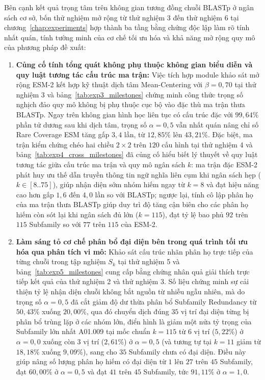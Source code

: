 Bên cạnh kết quả trọng tâm trên không gian tương đồng chuỗi BLASTp ở ngân sách cơ sở, bốn thử nghiệm mở rộng từ thử nghiệm 3 đến thử nghiệm 6 tại chương~\ref{chap:experiments} hợp thành ba tầng bằng chứng độc lập làm rõ tính nhất quán, tính tường minh của cơ chế tối ưu hóa và khả năng mở rộng quy mô của phương pháp đề xuất:

\begin{enumerate}
    \item \textbf{Củng cố tính tổng quát không phụ thuộc không gian biểu diễn và quy luật tương tác cấu trúc ma trận:} Việc tích hợp module khảo sát mở rộng ESM-2 kết hợp kỹ thuật dịch tâm Mean-Centering với $\beta = 0{,}70$ tại thử nghiệm 3 và bảng~\ref{tab:exp3_milestones} chứng minh công thức trọng số nghịch đảo quy mô không bị phụ thuộc cục bộ vào đặc thù ma trận thưa BLASTp. Ngay trên không gian hình học liên tục có cấu trúc đặc với $99{,}64\%$ phần tử dương sau khi dịch tâm, trọng số $\alpha = 0{,}5$ vẫn nhất quán nâng chỉ số Rare Coverage ESM tăng gấp $3{,}4$ lần, từ $12{,}85\%$ lên $43{,}21\%$. Đặc biệt, ma trận kiểm chứng chéo hai chiều $2 \times 2$ trên $120$ cấu hình tại thử nghiệm 4 và bảng~\ref{tab:exp4_cross_milestones} đã củng cố hiểu biết lý thuyết về quy luật tương tác giữa cấu trúc ma trận và quy mô ngân sách $k$: ma trận đặc ESM-2 phát huy ưu thế dẫn truyền thông tin ngữ nghĩa liên cụm khi ngân sách hẹp ($k \in [8..75]$), giúp nhận diện sớm nhóm hiếm ngay từ $k = 8$ và đạt hiệu năng cao hơn gấp $1{,}6$ đến $4{,}0$ lần so với BLASTp; ngược lại, tính cô lập phân họ của ma trận thưa BLASTp giúp duy trì độ tăng cận biên cho các phân họ hiếm còn sót lại khi ngân sách đủ lớn ($k = 115$), đạt tỷ lệ bao phủ $92$ trên $115$ Subfamily so với $77$ trên $115$ của ESM-2.
    
    \item \textbf{Làm sáng tỏ cơ chế phân bổ đại diện bên trong quá trình tối ưu hóa qua phân tích vi mô:} Khảo sát cấu trúc nhãn phân họ trực tiếp của từng chuỗi trong tập nghiệm $S_k$ tại thử nghiệm 5 và bảng~\ref{tab:exp5_milestones} cung cấp bằng chứng nhân quả giải thích trực tiếp kết quả của thử nghiệm 2 và thử nghiệm 3. Số liệu chứng minh sự cải thiện tỷ lệ nhận diện chuỗi không bắt nguồn từ nhiễu ngẫu nhiên, mà do trọng số $\alpha = 0{,}5$ đã cắt giảm độ dư thừa phân bổ Subfamily Redundancy từ $50{,}43\%$ xuống $20{,}00\%$, qua đó chuyển dịch đúng $35$ vị trí đại diện từng bị phân bổ trùng lặp ở các nhóm lớn, điển hình là giảm một nửa tỷ trọng của Subfamily lớn nhất A01.009 tại mốc chuẩn $k = 115$ từ $6$ vị trí ($5{,}22\%$) ở $\alpha = 0{,}0$ xuống còn $3$ vị trí ($2{,}61\%$) ở $\alpha = 0{,}5$ (và tương tự tại $k = 11$ giảm từ $18{,}18\%$ xuống $9{,}09\%$), sang cho $35$ Subfamily chưa có đại diện. Điều này giúp nâng số lượng phân họ hiếm có đại diện từ $1$ lên $27$ trên $45$ Subfamily, đạt $60{,}00\%$ ở $\alpha = 0{,}5$ và đạt $41$ trên $45$ Subfamily, tức $91{,}11\%$ ở $\alpha = 1{,}0$.
    

\end{enumerate}
